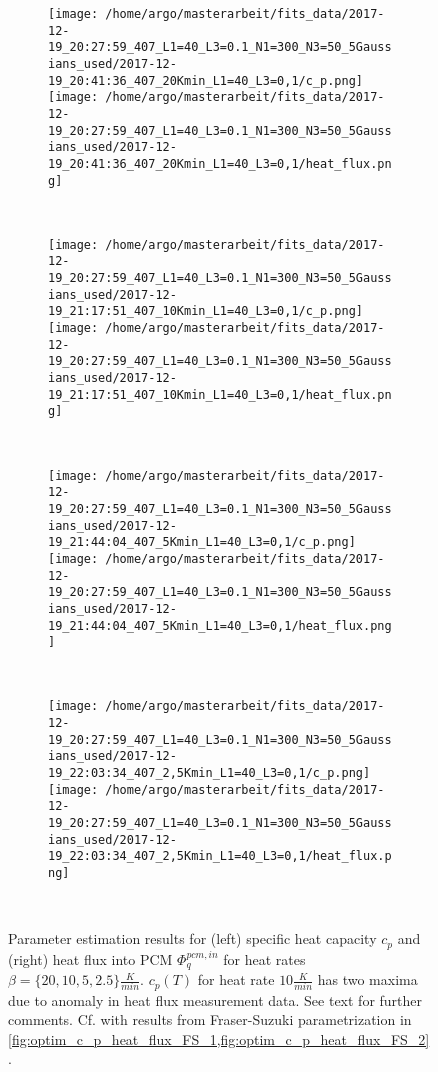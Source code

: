 \documentclass{scrartcl}[12pt, halfparskip]
\numberwithin{equation}{section}
\numberwithin{figure}{section}
\numberwithin{table}{section}
\begin{document}
\begin{figure}[H]
	\begin{subfigure}{1.\textwidth}
		\texttt{[image: /home/argo/masterarbeit/fits\_data/2017-12-19\_20:27:59\_407\_L1=40\_L3=0.1\_N1=300\_N3=50\_5Gaussians\_used/2017-12-19\_20:41:36\_407\_20Kmin\_L1=40\_L3=0,1/c\_p.png]}
		\texttt{[image: /home/argo/masterarbeit/fits\_data/2017-12-19\_20:27:59\_407\_L1=40\_L3=0.1\_N1=300\_N3=50\_5Gaussians\_used/2017-12-19\_20:41:36\_407\_20Kmin\_L1=40\_L3=0,1/heat\_flux.png]}
	\end{subfigure} \\[1ex]
	
	\begin{subfigure}{1.\textwidth}
		\texttt{[image: /home/argo/masterarbeit/fits\_data/2017-12-19\_20:27:59\_407\_L1=40\_L3=0.1\_N1=300\_N3=50\_5Gaussians\_used/2017-12-19\_21:17:51\_407\_10Kmin\_L1=40\_L3=0,1/c\_p.png]}
		\texttt{[image: /home/argo/masterarbeit/fits\_data/2017-12-19\_20:27:59\_407\_L1=40\_L3=0.1\_N1=300\_N3=50\_5Gaussians\_used/2017-12-19\_21:17:51\_407\_10Kmin\_L1=40\_L3=0,1/heat\_flux.png]}
	\end{subfigure} \\[1ex]
	
	\begin{subfigure}{1.\textwidth}
		\texttt{[image: /home/argo/masterarbeit/fits\_data/2017-12-19\_20:27:59\_407\_L1=40\_L3=0.1\_N1=300\_N3=50\_5Gaussians\_used/2017-12-19\_21:44:04\_407\_5Kmin\_L1=40\_L3=0,1/c\_p.png]}
		\texttt{[image: /home/argo/masterarbeit/fits\_data/2017-12-19\_20:27:59\_407\_L1=40\_L3=0.1\_N1=300\_N3=50\_5Gaussians\_used/2017-12-19\_21:44:04\_407\_5Kmin\_L1=40\_L3=0,1/heat\_flux.png]}
	\end{subfigure} \\[1ex]
	
	\begin{subfigure}{1.\textwidth}
		\texttt{[image: /home/argo/masterarbeit/fits\_data/2017-12-19\_20:27:59\_407\_L1=40\_L3=0.1\_N1=300\_N3=50\_5Gaussians\_used/2017-12-19\_22:03:34\_407\_2,5Kmin\_L1=40\_L3=0,1/c\_p.png]}
		\texttt{[image: /home/argo/masterarbeit/fits\_data/2017-12-19\_20:27:59\_407\_L1=40\_L3=0.1\_N1=300\_N3=50\_5Gaussians\_used/2017-12-19\_22:03:34\_407\_2,5Kmin\_L1=40\_L3=0,1/heat\_flux.png]}
	\end{subfigure} \\[1ex]
	

	\caption{Parameter estimation results for (left) specific heat capacity $c_p$ and (right) heat flux into PCM $\varPhi_q^{pcm,in}$ for heat rates $\beta=\{ 20, 10, 5, 2.5 \} \frac{K}{min}$. $c_p(T)$ for heat rate $10 \frac{K}{min}$ has two maxima due to anomaly in heat flux measurement data. See text for further comments. Cf. with results from Fraser-Suzuki parametrization in \cref{fig:optim_c_p_heat_flux_FS_1,fig:optim_c_p_heat_flux_FS_2}.}
	\label{fig:optim_c_p_heat_flux_5Gaussians_1}
\end{figure}
\end{document}
